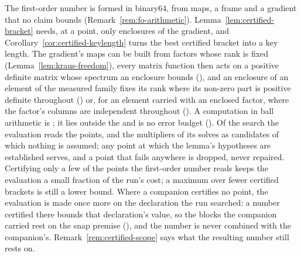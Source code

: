 
The first-order number is formed in binary64, from maps, a frame and a
gradient that no claim bounds (Remark~\ref{rem:fo-arithmetic}). Lemma~\ref{lem:certified-bracket}
needs, at a point, only enclosures of the gradient, and
Corollary~\ref{cor:certified-keylength} turns the best certified bracket into
a key length. The gradient's maps can be built from factors whose rank is
fixed (Lemma~\ref{lem:kraus-freedom}), every matrix function then acts on a
positive definite matrix whose spectrum an enclosure bounds
(), and an enclosure of an
element of the measured family fixes its rank where its non-zero part is
positive definite throughout
() or, for an element
carried with an enclosed factor, where the factor's columns are independent
throughout (). A computation
in ball arithmetic is ; it lies outside the
 and is no error budget
(). Of the search the evaluation reads
the points, and the multipliers of its solves as candidates of which nothing
is assumed; any point at which the lemma's hypotheses are established serves,
and a point that fails anywhere is dropped, never repaired. Certifying only
a few of the points the first-order number reads keeps the evaluation a
small fraction of the run's cost; a maximum over fewer certified brackets is
still a lower bound. Where a
companion certifies no point, the evaluation is made once more on the
declaration the run searched: a number certified there bounds that
declaration's value, so the blocks the companion carried rest on the snap
premise (), and the number is
never combined with the companion's. Remark~\ref{rem:certified-scope} says
what the resulting number still rests on.

